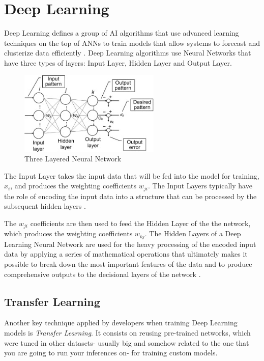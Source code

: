 \documentclass[openright]{normas-utf-tex} %
\begin{document}
\section{Deep Learning}

Deep Learning defines a group of AI algorithms that use advanced learning techniques on the 
top of ANNs to train models that allow systems to forecast and clusterize data 
efficiently \cite{IBMDeepLearning}.
Deep Learning algorithms use Neural Networks that have three types of layers:
Input Layer, Hidden Layer and Output Layer.
        
\begin{figure}[H]
	\centering
	\includegraphics[width=0.6\textwidth]{./images/three-layered-ann.jpg}
	\caption[Three Layered Neural Network]{Three Layered Neural Network}
	\label{fig:threeLayeredAnn}
\end{figure}

The Input Layer takes the input data that will be fed into the model for training,
$x_i$, and produces the weighting coefficients $w_{ji}$. The Input Layers
typically have the role of encoding the input data into a structure that can be processed by the 
subsequent hidden layers \cite{Paranjape2020}.

The $w_{ji}$ coefficients are then used to feed the Hidden Layer of the the network,
which produces the weighting coefficients $w_{kj}$. The Hidden Layers of a Deep Learning 
Neural Network are used for the heavy processing of the encoded input data by applying a series of 
mathematical operations that ultimately makes it possible to break down the most important features
of the data and to produce comprehensive outputs to the decisional layers of the network
\cite{DeepAI_HiddenLayer}.

\subsection{Transfer Learning}

Another key technique applied by developers when training Deep Learning models is
\textit{Transfer Learning}. 
It consists on reusing pre-trained networks, which were tuned in other datasets- usually big and
somehow related to the one that you are going to run your inferences on- for training custom models.
\end{document}
